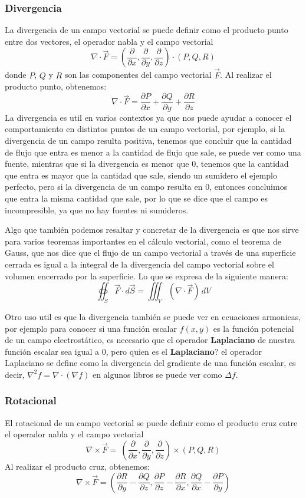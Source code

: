 \subsubsection{Divergencia}
La  divergencia de un campo vectorial se puede definir como el producto punto entre dos vectores, el operador nabla y el
campo vectorial $$ \nabla \cdot \vec{F} = 
\left( \frac{\partial}{\partial x}, \frac{\partial}{\partial y}, \frac{\partial}{\partial z} \right) 
\cdot \left( P, Q, R \right) $$
donde $P$, $Q$ y $R$ son las componentes del campo vectorial $\vec{F}$. Al realizar el producto punto, obtenemos: 
$$ 
\nabla \cdot \vec{F} = \frac{\partial P}{\partial x} + \frac{\partial Q}{\partial y} + \frac{\partial R}{\partial z}
$$
La divergencia es util en varios contextos ya que nos puede ayudar a conocer el comportamiento en distintos puntos
de un campo vectorial, por ejemplo, si la divergencia de un campo resulta positiva, tenemos que concluir que la cantidad
de flujo que entra es menor a la cantidad de flujo que sale, se puede ver como una fuente, mientras que si la divergencia
es menor que 0, tenemos que la cantidad que entra es mayor que la cantidad que sale, siendo un sumidero el ejemplo
perfecto, pero si la divergencia de un campo resulta en 0, entonces concluimos que entra la misma cantidad que sale, 
por lo que se dice que el campo es incompresible, ya que no hay fuentes ni sumideros.

Algo que también podemos resaltar y concretar de la divergencia es que nos sirve para varios teoremas importantes en el 
cálculo vectorial, como el teorema de Gauss, que nos dice que el flujo de un campo vectorial a través de una superficie
cerrada es igual a la integral de la divergencia del campo vectorial sobre el volumen encerrado por la superficie. Lo que
se expresa de la siguiente manera:
$$ \oiint_S \vec{F} \cdot d\vec{S} = \iiint_V (\nabla \cdot \vec{F}) \, dV $$

Otro uso util es que la divergencia también se puede ver en ecuaciones armonicas, por ejemplo para conocer si una función
escalar $f(x,y)$ es la función potencial de un campo electrostático, es necesario que el operador \textbf{Laplaciano}
de nuestra función escalar sea igual a 0, pero quien es el \textbf{Laplaciano}? el operador Laplaciano se define como
la divergencia del  gradiente de una función escalar, es decir, $ \nabla^2 f = \nabla \cdot (\nabla f) $ en algunos libros
se puede ver como  $ \Delta f $.
\subsubsection{Rotacional}
El rotacional de un campo vectorial se puede definir como el producto cruz entre el operador nabla y el campo vectorial 
$$ \nabla \times \vec{F} = 
\ \left( \frac{\partial}{\partial x}, \frac{\partial}{\partial y}, \frac{\partial}{\partial z} \right) 
\times \left( P, Q, R \right) $$
Al realizar el producto cruz, obtenemos:
$$
\nabla \times \vec{F} = \left( \frac{\partial R}{\partial y} - \frac{\partial Q}{\partial z}, \frac{\partial P}{\partial z} 
- \frac{\partial R}{\partial x}, \frac{\partial Q}{\partial x} - \frac{\partial P}{\partial y} \right)$$

